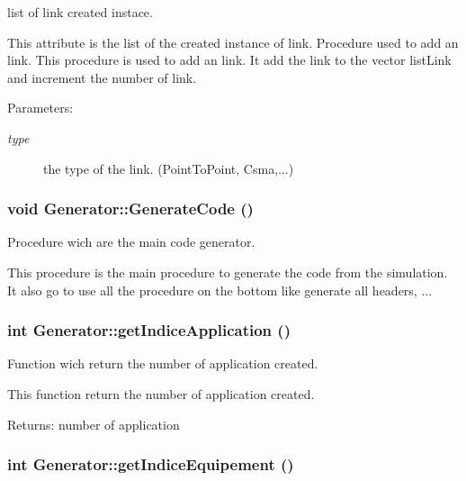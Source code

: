 list of link created instace. 

This attribute is the list of the created instance of link. Procedure used to add an link. This procedure is used to add an link. It add the link to the vector listLink and increment the number of link.

\begin{Desc}
\item[Parameters:]
\begin{description}
\item[{\em type}]the type of the link. (PointToPoint, Csma,...) \end{description}
\end{Desc}
\hypertarget{class_generator_caee4fe4990cee0447f0cb27ef413c9b}{
\subsubsection[{GenerateCode}]{\setlength{\rightskip}{0pt plus 5cm}void Generator::GenerateCode ()}}
\label{class_generator_caee4fe4990cee0447f0cb27ef413c9b}


Procedure wich are the main code generator. 

This procedure is the main procedure to generate the code from the simulation. It also go to use all the procedure on the bottom like generate all headers, ... \hypertarget{class_generator_32a1fcc314ade484d84669ac7e510e68}{
\subsubsection[{getIndiceApplication}]{\setlength{\rightskip}{0pt plus 5cm}int Generator::getIndiceApplication ()}}
\label{class_generator_32a1fcc314ade484d84669ac7e510e68}


Function wich return the number of application created. 

This function return the number of application created.

\begin{Desc}
\item[Returns:]number of application \end{Desc}
\hypertarget{class_generator_714d17823705b75edfbb9bbe37d35c7a}{
\subsubsection[{getIndiceEquipement}]{\setlength{\rightskip}{0pt plus 5cm}int Generator::getIndiceEquipement ()}}
\label{class_generator_714d17823705b75edfbb9bbe37d35c7a}


